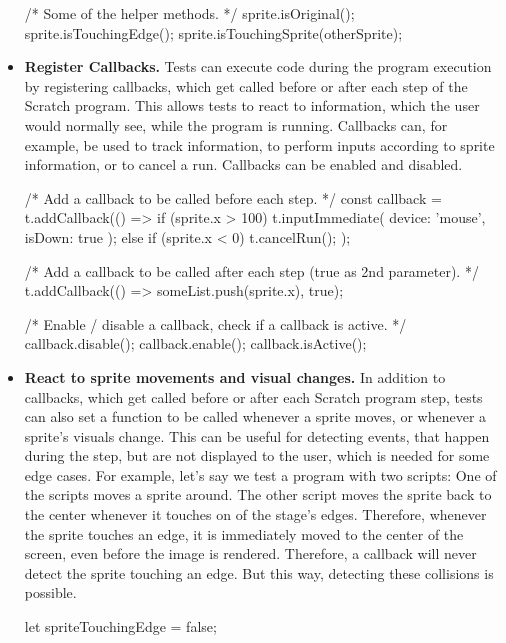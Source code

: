 \begin{itemize}
\begin{javascriptcode}
            /* Some of the helper methods. */
            sprite.isOriginal();
            sprite.isTouchingEdge();
            sprite.isTouchingSprite(otherSprite);
        \end{javascriptcode}
    \item \textbf{Register Callbacks.}
        Tests can execute code during the program execution by registering callbacks, which get called before or after each step of the Scratch program.
        This allows tests to react to information, which the user would normally see, while the program is running.
        Callbacks can, for example, be used to track information, to perform inputs according to sprite information, or to cancel a run.
        Callbacks can be enabled and disabled.
        \begin{javascriptcode}
            /* Add a callback to be called before each step. */
            const callback = t.addCallback(() => {
                if (sprite.x > 100) {
                    t.inputImmediate({ device: 'mouse', isDown: true });
                } else if (sprite.x < 0) {
                    t.cancelRun();
                }
            });

            /* Add a callback to be called after each step (true as 2nd parameter). */
            t.addCallback(() => someList.push(sprite.x), true);

            /* Enable / disable a callback, check if a callback is active. */
            callback.disable();
            callback.enable();
            callback.isActive();
        \end{javascriptcode}
    \item \textbf{React to sprite movements and visual changes.}
        In addition to callbacks, which get called before or after each Scratch program step,
        tests can also set a function to be called whenever a sprite moves, or whenever a sprite's visuals change.
        This can be useful for detecting events, that happen during the step, but are not displayed to the user,
        which is needed for some edge cases.
        For example, let's say we test a program with two scripts:
        One of the scripts moves a sprite around.
        The other script moves the sprite back to the center whenever it touches on of the stage's edges.
        Therefore, whenever the sprite touches an edge, it is immediately moved to the center of the screen,
        even before the image is rendered.
        Therefore, a callback will never detect the sprite touching an edge.
        But this way, detecting these collisions is possible.
        \begin{javascriptcode}
            let spriteTouchingEdge = false;


\end{javascriptcode}
\end{itemize}
